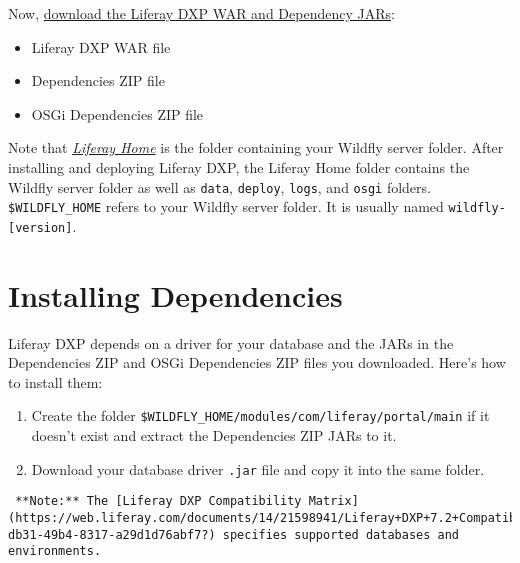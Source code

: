 Now,
\href{/docs/7-2/deploy/-/knowledge_base/d/obtaining-product\#downloading-the-liferay-war-and-dependency-jars}{download
the Liferay DXP WAR and Dependency JARs}:

\begin{itemize}
\tightlist
\item
  Liferay DXP WAR file
\item
  Dependencies ZIP file
\item
  OSGi Dependencies ZIP file
\end{itemize}

Note that
\href{/docs/7-2/deploy/-/knowledge_base/d/liferay-home}{\emph{Liferay
Home}} is the folder containing your Wildfly server folder. After
installing and deploying Liferay DXP, the Liferay Home folder contains
the Wildfly server folder as well as \texttt{data}, \texttt{deploy},
\texttt{logs}, and \texttt{osgi} folders. \texttt{\$WILDFLY\_HOME}
refers to your Wildfly server folder. It is usually named
\texttt{wildfly-{[}version{]}}.

\section{Installing Dependencies}\label{installing-dependencies-1}

Liferay DXP depends on a driver for your database and the JARs in the
Dependencies ZIP and OSGi Dependencies ZIP files you downloaded. Here's
how to install them:

\begin{enumerate}
\def\labelenumi{\arabic{enumi}.}
\item
  Create the folder
  \texttt{\$WILDFLY\_HOME/modules/com/liferay/portal/main} if it doesn't
  exist and extract the Dependencies ZIP JARs to it.
\item
  Download your database driver \texttt{.jar} file and copy it into the
  same folder.
\end{enumerate}

\noindent\hrulefill

\begin{verbatim}
 **Note:** The [Liferay DXP Compatibility Matrix](https://web.liferay.com/documents/14/21598941/Liferay+DXP+7.2+Compatibility+Matrix/b6e0f064-db31-49b4-8317-a29d1d76abf7?) specifies supported databases and environments.
\end{verbatim}

\noindent\hrulefill

